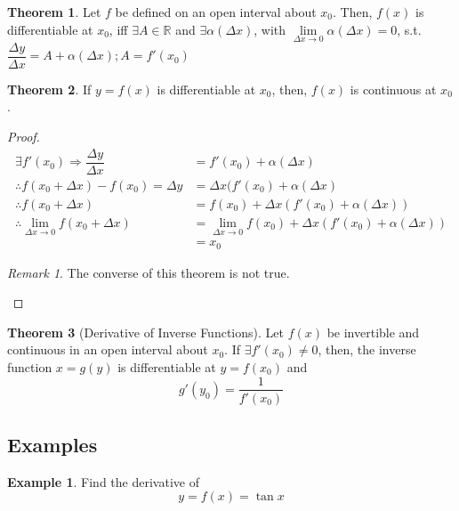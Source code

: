 \documentclass[fleqn]{article}
\theoremstyle{definition}
\newtheorem{example}{Example}
\theoremstyle{theorem}
\newtheorem{theorem}{Theorem}
\theoremstyle{remark}
\newtheorem{remark}{Remark}
\begin{document}
\begin{theorem}
	Let $f$ be defined on an open interval about $x_0$. Then, $f(x)$ is differentiable at $x_0$, iff $\exists A \in \mathbb{R}$ and $\exists \alpha(\Delta x)$, with $\lim\limits_{\Delta x \rightarrow 0} \alpha(\Delta x) = 0$, s.t. $\dfrac{\Delta y}{\Delta x} = A + \alpha(\Delta x) ; A = f'(x_0)$
\end{theorem}

\begin{theorem}
	If $y = f(x)$ is differentiable at $x_0$, then, $f(x)$ is continuous at $x_0$.
\end{theorem}

\begin{proof}
	\begin{align*}
		\exists f'(x_0) \Rightarrow \dfrac{\Delta y}{\Delta x} &= f'(x_0) + \alpha(\Delta x) \\
		\therefore f(x_0 + \Delta x) - f(x_0) = \Delta y &= \Delta x (f'(x_0) + \alpha(\Delta x) \\
		\therefore f(x_0 + \Delta x) &= f(x_0) + \Delta x (f'(x_0) + \alpha(\Delta x)) \\
		\therefore \lim\limits_{\Delta x \rightarrow 0}f(x_0 + \Delta x) &= \lim\limits_{\Delta x \rightarrow 0}f(x_0) + \Delta x (f'(x_0) + \alpha(\Delta x)) \\
		&= x_0 
	\end{align*}
	
	\begin{remark}
		The converse of this theorem is not true.
	\end{remark}
\end{proof}

\begin{theorem}[Derivative of Inverse Functions]
	Let $f(x)$ be invertible and continuous in an open interval about $x_0$. If $\exists f'(x_0) \neq 0$, then, the inverse function $x = g(y)$ is differentiable at $y = f(x_0)$ and
	\begin{equation*}
		g'(y_0) = \dfrac{1}{f'(x_0)}
	\end{equation*}
\end{theorem}

\subsection{Examples}

\begin{example}
	Find the derivative of 
	\begin{equation*}
		y = f(x) = \tan x 
	\end{equation*}
\end{example}
\end{document}
